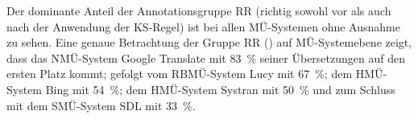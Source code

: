 
Der dominante Anteil der Annotationsgruppe RR (richtig sowohl vor als auch nach der Anwendung der KS-Regel) ist bei allen MÜ-Systemen ohne Ausnahme zu sehen. Eine genaue Betrachtung der Gruppe RR () auf MÜ-Systemebene zeigt, dass das NMÜ-System Google Translate mit 83~\% seiner Übersetzungen auf den ersten Platz kommt; gefolgt vom RBMÜ-System Lucy mit 67~\%; dem HMÜ-System Bing mit 54~\%; dem HMÜ-System Systran mit 50~\% und zum Schluss mit dem SMÜ-System SDL mit 33~\%.


\begin{figure}






\end{figure}
